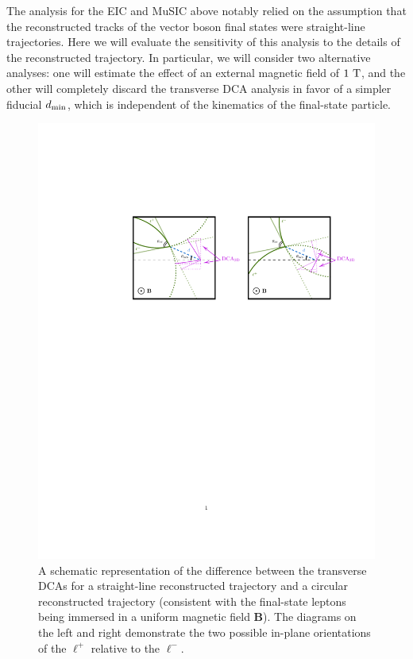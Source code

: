 The analysis for the EIC and MuSIC above notably relied on the assumption that the reconstructed tracks of the vector boson final states were straight-line trajectories. Here we will evaluate the sensitivity of this analysis to the details of the reconstructed trajectory. In particular, we will consider two alternative analyses: one will estimate the effect of an external magnetic field of $1~{\rm T}$, and the other will completely discard the transverse DCA analysis in favor of a simpler fiducial $d_{\rm min}$, which is independent of the kinematics of the final-state particle.


\begin{figure}[t!]
    \centering
    \includegraphics[width=\linewidth]{figures/chapter6/Bfield.pdf}
    \caption[A schematic representation of the difference between the transverse DCAs for a straight-line reconstructed trajectory and a circular reconstructed trajectory.]{A schematic representation of the difference between the transverse DCAs for a straight-line reconstructed trajectory and a circular reconstructed trajectory (consistent with the final-state leptons being immersed in a uniform magnetic field {\bf B}). The diagrams on the left and right demonstrate the two possible in-plane orientations of the $\ell^+$ relative to the $\ell^-$.}
    \label{fig:BfieldDCA}
\end{figure}


